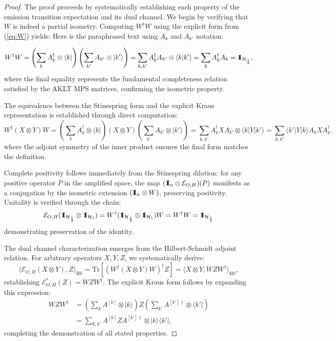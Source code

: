 \documentclass[12pt,a4paper]{article}
\def\id{{\bf 1}\!\!{\rm I}}
\begin{document}
\begin{proof}%
The proof proceeds by systematically establishing each property of the emission transition expectation and its dual channel. We begin by verifying that $W$ is indeed a partial isometry. Computing $W^\dagger W$ using the explicit form from (\ref{eq:W}) yields:
Here is the paraphrased text using \( A_k \) and \( A_{k'} \) notation:

\[
W^\dagger W = \left(\sum_k A_{k}^{\dagger} \otimes \langle k|\right)\left(\sum_{k'} A_{k'} \otimes |k'\rangle\right) = \sum_{k,k'} A_{k}^{\dagger} A_{k'} \otimes \langle k|k'\rangle = \sum_k A_k^{\dagger} A_{k} = \id_{\mathcal{H}_{\frac{1}{2}}},
\]
where the final equality represents the fundamental completeness relation satisfied by the AKLT MPS matrices, confirming the isometric property.

The equivalence between the Stinespring form and the explicit Kraus representation is established through direct computation:
\[
W^\dagger(X \otimes Y)W = \left(\sum_k A_{k}^{\dagger} \otimes \langle k|\right)(X \otimes Y)\left(\sum_{k'} A_{k'} \otimes |k'\rangle\right) = \sum_{k,k'} A_{k}^{\dagger} X A_{k'} \otimes \langle k|Y|k'\rangle = \sum_{k,k'} \langle k'|Y|k\rangle A_{k} X A_{k}^{\dagger}.
\]
where the adjoint symmetry of the inner product ensures the final form matches the definition.

Complete positivity follows immediately from the Stinespring dilation: for any positive operator $P$ in the amplified space, the map $(\id_n \otimes \mathcal{E}_{O,H})(P)$ manifests as a conjugation by the isometric extension $(\id_n \otimes W)$, preserving positivity. Unitality is verified through the chain:
\[
\mathcal{E}_{O,H}(\id_{\mathcal{H}_{\frac{1}{2}}} \otimes \id_{\mathcal{H}_{1}}) = W^\dagger(\id_{\mathcal{H}_{\frac{1}{2}}} \otimes \id_{\mathcal{H}_{1}})W = W^\dagger W = \id_{\mathcal{H}_{\frac{1}{2}}}
\]
demonstrating preservation of the identity.

The dual channel characterization emerges from the Hilbert-Schmidt adjoint relation. For arbitrary operators $X,Y,Z$, we systematically derive:
\[
\langle \mathcal{E}_{O,H}(X \otimes Y), Z \rangle_{\mathrm{HS}} = \mathrm{Tr}[(W^\dagger(X \otimes Y)W)^\dagger Z] = \langle X \otimes Y, W Z W^\dagger \rangle_{\mathrm{HS}},
\]
establishing $\mathcal{E}_{O,H}^*(Z) = W Z W^\dagger$. The explicit Kraus form follows by expanding this expression:
\begin{align*}
W Z W^\dagger &= \left(\sum_k A^{[k]} \otimes |k\rangle\right) Z \left(\sum_{k'} A^{[k']\dagger} \otimes \langle k'|\right) \\
&= \sum_{k,k'} A^{[k]} Z A^{[k']\dagger} \otimes |k\rangle\langle k'|,
\end{align*}
completing the demonstration of all stated properties.
\end{proof}
\end{document}
